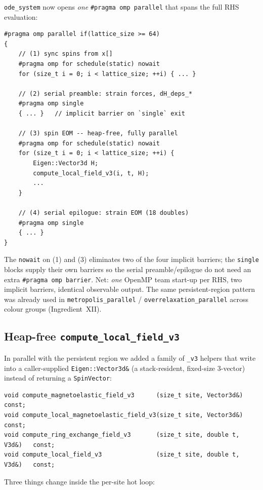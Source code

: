 \documentclass[11pt,letterpaper]{article}
\begin{document}
\texttt{ode\_system} now opens \emph{one} \texttt{\#pragma omp
parallel} that spans the full RHS evaluation:

\begin{lstlisting}
#pragma omp parallel if(lattice_size >= 64)
{
    // (1) sync spins from x[]
    #pragma omp for schedule(static) nowait
    for (size_t i = 0; i < lattice_size; ++i) { ... }

    // (2) serial preamble: strain forces, dH_deps_*
    #pragma omp single
    { ... }   // implicit barrier on `single` exit

    // (3) spin EOM -- heap-free, fully parallel
    #pragma omp for schedule(static) nowait
    for (size_t i = 0; i < lattice_size; ++i) {
        Eigen::Vector3d H;
        compute_local_field_v3(i, t, H);
        ...
    }

    // (4) serial epilogue: strain EOM (18 doubles)
    #pragma omp single
    { ... }
}
\end{lstlisting}

The \texttt{nowait} on (1) and (3) eliminates two of the four
implicit barriers; the \texttt{single} blocks supply their own
barriers so the serial preamble/epilogue do not need an extra
\texttt{\#pragma omp barrier}.  Net: \emph{one} OpenMP team
start-up per RHS, two implicit barriers, identical observable
output.  The same persistent-region pattern was already used in
\texttt{metropolis\_parallel} / \texttt{overrelaxation\_parallel}
across colour groups (Ingredient~XII).

\subsection{Heap-free \texttt{compute\_local\_field\_v3}}

In parallel with the persistent region we added a family of
\texttt{\_v3} helpers that write into a caller-supplied
\texttt{Eigen::Vector3d\&} (a stack-resident, fixed-size 3-vector)
instead of returning a \texttt{SpinVector}:

\begin{lstlisting}
void compute_magnetoelastic_field_v3      (size_t site, Vector3d&)        const;
void compute_local_magnetoelastic_field_v3(size_t site, Vector3d&)        const;
void compute_ring_exchange_field_v3       (size_t site, double t, V3d&)   const;
void compute_local_field_v3               (size_t site, double t, V3d&)   const;
\end{lstlisting}

Three things change inside the per-site hot loop:
\end{document}

